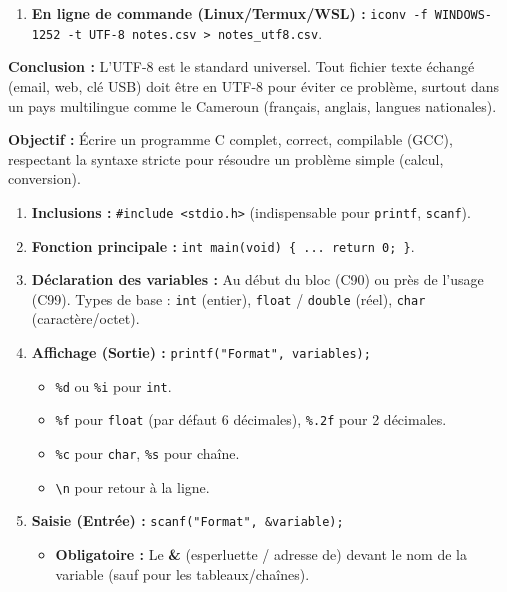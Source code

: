 \documentclass[11pt]{article}
\begin{document}
\begin{exoresolu}
\begin{enumerate}
\begin{enumerate}
            \item \textbf{En ligne de commande (Linux/Termux/WSL) :} \texttt{iconv -f WINDOWS-1252 -t UTF-8 notes.csv > notes\_utf8.csv}.
        \end{enumerate}
    \end{enumerate}
    \textbf{Conclusion :} L'UTF-8 est le standard universel. Tout fichier texte échangé (email, web, clé USB) doit être en UTF-8 pour éviter ce problème, surtout dans un pays multilingue comme le Cameroun (français, anglais, langues nationales).
\end{exoresolu}

\begin{methode}
    \textbf{Objectif :} Écrire un programme C complet, correct, compilable (GCC), respectant la syntaxe stricte pour résoudre un problème simple (calcul, conversion).
    \begin{enumerate}
        \item \textbf{Inclusions :} \texttt{\#include <stdio.h>} (indispensable pour \texttt{printf}, \texttt{scanf}).
        \item \textbf{Fonction principale :} \texttt{int main(void) \{ ... return 0; \}}.
        \item \textbf{Déclaration des variables :} Au début du bloc (C90) ou près de l'usage (C99). Types de base : \texttt{int} (entier), \texttt{float} / \texttt{double} (réel), \texttt{char} (caractère/octet).
        \item \textbf{Affichage (Sortie) :} \texttt{printf("Format", variables);} 
        \begin{itemize}
            \item \texttt{\%d} ou \texttt{\%i} pour \texttt{int}.
            \item \texttt{\%f} pour \texttt{float} (par défaut 6 décimales), \texttt{\%.2f} pour 2 décimales.
            \item \texttt{\%c} pour \texttt{char}, \texttt{\%s} pour chaîne.
            \item \texttt{\textbackslash n} pour retour à la ligne.
        \end{itemize}
        \item \textbf{Saisie (Entrée) :} \texttt{scanf("Format", \&variable);} 
        \begin{itemize}
            \item \textbf{Obligatoire :} Le \textbf{\&} (esperluette / adresse de) devant le nom de la variable (sauf pour les tableaux/chaînes).

\end{itemize}
\end{enumerate}
\end{methode}
\end{document}

